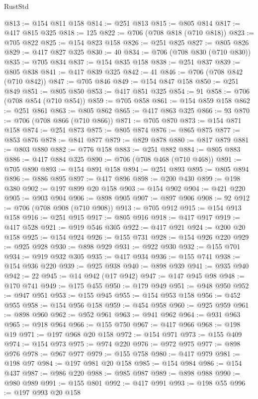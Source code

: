 \begin{lexlean}{RustStd}
\begin{coremodule}
@813 := @154 @811 @158
@814 := @251 @813
@815 := @805 @814
@817 := @417 @815 @325
@818 := 125
@822 := @706 (@708 @818 (@710 @818))
@823 := @705 @822
@825 := @154 @823 @158
@826 := @251 @825
@827 := @805 @826
@829 := @417 @827 @325
@830 := 40
@834 := @706 (@708 @830 (@710 @830))
@835 := @705 @834
@837 := @154 @835 @158
@838 := @251 @837
@839 := @805 @838
@841 := @417 @839 @325
@842 := 41
@846 := @706 (@708 @842 (@710 @842))
@847 := @705 @846
@849 := @154 @847 @158
@850 := @251 @849
@851 := @805 @850
@853 := @417 @851 @325
@854 := 91
@858 := @706 (@708 @854 (@710 @854))
@859 := @705 @858
@861 := @154 @859 @158
@862 := @251 @861
@863 := @805 @862
@865 := @417 @863 @325
@866 := 93
@870 := @706 (@708 @866 (@710 @866))
@871 := @705 @870
@873 := @154 @871 @158
@874 := @251 @873
@875 := @805 @874
@876 := @865 @875
@877 := @853 @876
@878 := @841 @877
@879 := @829 @878
@880 := @817 @879
@881 := @803 @880
@882 := @776 @158
@883 := @251 @882
@884 := @805 @883
@886 := @417 @884 @325
@890 := @706 (@708 @468 (@710 @468))
@891 := @705 @890
@893 := @154 @891 @158
@894 := @251 @893
@895 := @805 @894
@896 := @886 @895
@897 := @417 @896
@898 := @200 @430
@899 := @198 @380
@902 := @197 @899 @20 @158
@903 := @154 @902
@904 := @421 @220
@905 := @903 @904
@906 := @898 @905
@907 := @897 @906
@908 := 92
@912 := @706 (@708 @908 (@710 @908))
@913 := @705 @912
@915 := @154 @913 @158
@916 := @251 @915
@917 := @805 @916
@918 := @417 @917
@919 := @417 @528
@921 := @919 @546 @305
@922 := @417 @921
@924 := @200 @20 @158
@925 := @154 @924
@926 := @155 @731
@928 := @154 @926 @220
@929 := @925 @928
@930 := @898 @929
@931 := @922 @930
@932 := @155 @701
@934 := @919 @932 @305
@935 := @417 @934
@936 := @155 @741
@938 := @154 @936 @220
@939 := @925 @938
@940 := @898 @939
@941 := @935 @940
@942 := 22
@945 := @14 @942 (@17 @942)
@947 := @147 @945 @98
@948 := @170 @741
@949 := @175 @455
@950 := @179 @949
@951 := @948 @950
@952 := @947 @951
@953 := @155 @945
@955 := @154 @953 @158
@956 := @452 @955
@958 := @154 @956 @158
@959 := @454 @958
@960 := @925 @959
@961 := @898 @960
@962 := @952 @961
@963 := @941 @962
@964 := @931 @963
@965 := @918 @964
@966 := @155 @750
@967 := @417 @966
@968 := @198 @19
@971 := @197 @968 @20 @158
@972 := @154 @971
@973 := @155 @409
@974 := @154 @973
@975 := @974 @220
@976 := @972 @975
@977 := @898 @976
@978 := @967 @977
@979 := @155 @758
@980 := @417 @979
@981 := @198 @97
@984 := @197 @981 @20 @158
@985 := @154 @984
@986 := @154 @437
@987 := @986 @220
@988 := @985 @987
@989 := @898 @988
@990 := @980 @989
@991 := @155 @801
@992 := @417 @991
@993 := @198 @55
@996 := @197 @993 @20 @158

\end{coremodule}
\end{lexlean}
